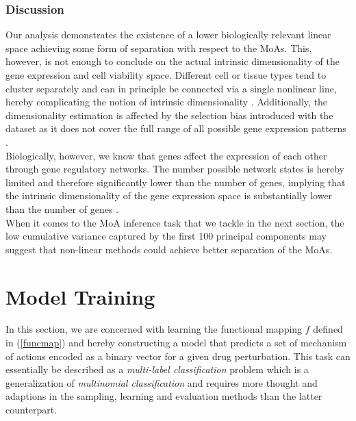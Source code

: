 \documentclass[bsc,frontabs,twoside,singlespacing,parskip,deptreport]{infthesis}     %
\let\Oldsubsection\subsection
\renewcommand{\subsection}{\FloatBarrier\Oldsubsection}
\begin{document}
\subsection{Discussion}
Our analysis demonstrates the existence of a lower biologically relevant linear space achieving some form of separation with respect to the
MoAs. This, however, is not enough to conclude on the actual intrinsic dimensionality of the gene expression and cell viability space. Different cell or tissue types tend to cluster separately and can in principle be connected via a single nonlinear line, hereby complicating the notion of intrinsic dimensionality \cite{lenz_principal_2016}. Additionally, the dimensionality estimation is affected by the selection bias introduced with the dataset as it does not cover the full range of all possible gene expression patterns \cite{lenz_principal_2016}.\\
Biologically, however, we know that genes affect the expression of each other through gene regulatory networks. The number possible network states is hereby limited and therefore significantly lower than the number of genes, implying that the intrinsic dimensionality of the  gene expression space is substantially lower than the number of genes \cite{lenz_principal_2016}.\\ 
When it comes to the MoA inference task that we tackle in the next section, the low cumulative variance captured by the first 100 principal components may suggest that non-linear methods  could achieve better separation of the MoAs.

\chapter{Model Training}\label{model_training}
In this section, we are concerned with learning the functional mapping \(f\) defined in (\ref{funcmap}) and hereby constructing a model that predicts a set of mechanism of actions encoded as a binary vector for a given drug perturbation. 
This task can essentially be described as a \textit{multi-label classification} problem which is a generalization of \textit{multinomial classification} and requires more thought and adaptions in the sampling, learning and evaluation methods than the latter counterpart.\\
\end{document}
